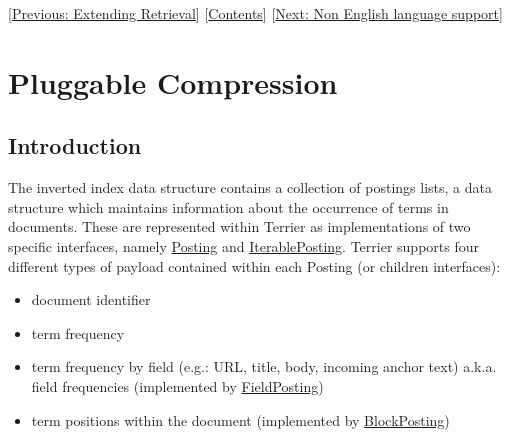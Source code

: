 {[}\href{extend_retrieval.html}{Previous: Extending Retrieval}{]}
{[}\href{index.html}{Contents}{]} {[}\href{languages.html}{Next: Non
English language support}{]}\\[2\baselineskip]

\section{Pluggable Compression}\label{pluggable-compression}

\subsection{Introduction}\label{introduction}

The inverted index data structure contains a collection of postings
lists, a data structure which maintains information about the occurrence
of terms in documents. These are represented within Terrier as
implementations of two specific interfaces, namely
\href{javadoc/org/terrier/structures/postings/Posting.html}{Posting} and
\href{javadoc/org/terrier/structures/postings/IterablePosting.html}{IterablePosting}.
Terrier supports four different types of payload contained within each
Posting (or children interfaces):

\begin{itemize}
\tightlist
\item
  document identifier
\item
  term frequency
\item
  term frequency by field (e.g.: URL, title, body, incoming anchor text)
  a.k.a. field frequencies (implemented by
  \href{javadoc/org/terrier/structures/postings/FieldPosting.html}{FieldPosting})
\item
  term positions within the document (implemented by
  \href{javadoc/org/terrier/structures/postings/BlockPosting.html}{BlockPosting})
\end{itemize}

